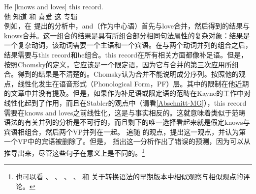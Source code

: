 
\ea
\label{ex-he-knows-and-loves-this-record-MP}
\gll He [knows and loves] this record.\\
     他 \spacebr{}知道 和 喜爱 这 专辑\\
\z
例如，在 \citet[]{Steedman91a}提出的分析中，and（作为中心语）首先与love合并，然后得到的结果与knows合并。这一组合的结果是具有所组合部分相同句法属性的复杂对象：结果是一个复杂动词，该动词需要一个主语和一个宾语。在与两个动词并列的组合之后，结果需要与this record和he组合。this record在所有相关方面都像补足语。但是，按照Chomsky的定义，它应该是一个限定语，因为它与合并的第三次应用所组合。得到的结果是不清楚的。Chomsky认为合并不能说明成分序列。按照他的观点，线性化发生在语音形式（Phonological
    Form，PF）层。其中的限制在他近期的文章中并没有提及。但是，如果作为补足语或限定语的范畴在Kayne的工作中对线性化起到了作用，而且在Stabler的观点中（请看\ref{Abschnitt-MG}），this record需要在knows and loves之前线性化，这是与事实相反的。这就意味着类似于范畴语法的有关并列的分析是不可行的，而且剩下的唯一选择看起来就是假定knows与宾语相组合，然后两个VP并列在一起。 \citet[, 67]{Kayne94a-u}追随 \citet[]{WC80a-u}的观点，提出这一观点，并认为第一个VP中的宾语被删除了。但是， \citet[]{Borsley2005a}指出这一分析作出了错误的预测，因为可以从推导出来，尽管这些句子在意义上是不同的。\footnote{%
也可以看 、 、 、 、 和 关于转换语法的早期版本中相似观察与相似观点的评论。
}
